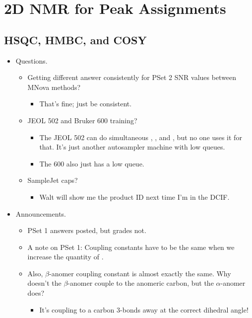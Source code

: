 \documentclass[../notes.tex]{subfiles}
\begin{document}
\chapter{2D NMR for Peak Assignments}
\section{HSQC, HMBC, and COSY}
\begin{itemize}
    \item {}Questions.
    \begin{itemize}
        \item Getting different answer consistently for PSet 2 SNR values between MNova methods?
        \begin{itemize}
            \item That's fine; just be consistent.
        \end{itemize}
        \item JEOL 502 and Bruker 600 training?
        \begin{itemize}
            \item The JEOL 502 can do simultaneous , , and , but no one uses it for that. It's just another autosampler machine with low queues.
            \item The 600 also just has a low queue.
        \end{itemize}
        \item SampleJet caps?
        \begin{itemize}
            \item Walt will show me the product ID next time I'm in the DCIF.
        \end{itemize}
    \end{itemize}
    \item Announcements.
    \begin{itemize}
        \item PSet 1 answers posted, but grades not.
        \item A note on PSet 1: Coupling constants have to be the same when we increase the quantity of .
        \item Also, $\beta$-anomer coupling constant is almost exactly the same. Why doesn't the $\beta$-anomer couple to the anomeric carbon, but the $\alpha$-anomer does?
        \begin{itemize}
            \item It's coupling to a carbon 3-bonds away at the correct dihedral angle!

\end{itemize}
\end{itemize}
\end{itemize}
\end{document}
